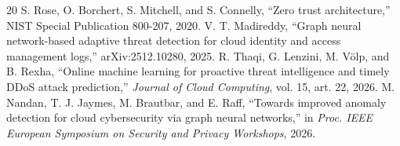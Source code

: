 \documentclass[conference]{IEEEtran}
\begin{document}
\begin{thebibliography}{20}
S. Rose, O. Borchert, S. Mitchell, and S. Connelly, ``Zero trust architecture,'' NIST Special Publication 800-207, 2020.
V. T. Madireddy, ``Graph neural network-based adaptive threat detection for cloud identity and access management logs,'' arXiv:2512.10280, 2025.
R. Thaqi, G. Lenzini, M. V\"olp, and B. Rexha, ``Online machine learning for proactive threat intelligence and timely DDoS attack prediction,'' \emph{Journal of Cloud Computing}, vol. 15, art. 22, 2026.
M. Nandan, T. J. Jaymes, M. Brautbar, and E. Raff, ``Towards improved anomaly detection for cloud cybersecurity via graph neural networks,'' in \emph{Proc. IEEE European Symposium on Security and Privacy Workshops}, 2026.
\end{thebibliography}
\end{document}
